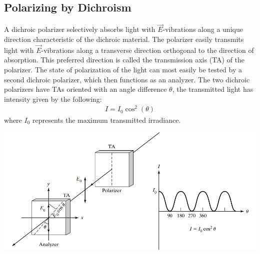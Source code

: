 \documentclass[11pt]{book}
\theoremstyle{break}
\theoremstyle{break}
\begin{document}
\subsection{Polarizing by Dichroism}
A dichroic polarizer selectively absorbs light with $\vec{E}$-vibrations along a unique direction characteristic of the dichroic material. The polarizer easily
transmits light with $\vec{E}$-vibrations along a transverse direction orthogonal to the direction of absorption. This preferred direction is called the transmission axis (TA) of the polarizer. The state of polarization of the light can most easily be tested by a second dichroic polarizer, which then functions as an analyzer. The two dichroic polarizers have TAs oriented with an angle difference $\theta$, the transmitted light has intensity given by the following: 
\begin{align*}
I = I_0 \cos^2(\theta) \tag{Malus' Law}
\end{align*} 
where $I_0$ represents the maximum transmitted irradiance. 
\begin{center}
\includegraphics[scale=0.69]{PolAna}
\end{center}
\end{document}
